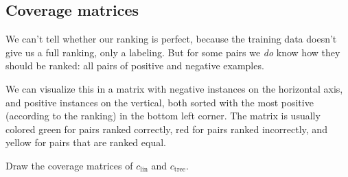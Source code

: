 \documentclass[11pt]{article}
\begin{document}

\subsection{Coverage matrices}

We can't tell whether our ranking is perfect, because the training data doesn't give us a full ranking, only a labeling. But for some pairs we \emph{do} know how they should be ranked: all pairs of positive and negative examples. 


We can visualize this in a matrix with negative instances on the horizontal axis, and positive instances on the vertical, both sorted with the most positive (according to the ranking) in the bottom left corner. The matrix is usually colored green for pairs ranked correctly, red for pairs ranked incorrectly, and yellow for pairs that are ranked equal.


Draw the coverage matrices of $c_\text{lin}$ and $c_\text{tree}$.
\end{document}
